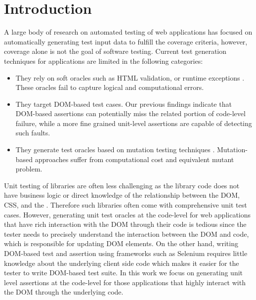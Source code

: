 \section{Introduction} \label{Sec:intro}
A large body of research on automated testing of \javascript web applications has focused on automatically generating test input data to fulfill the coverage criteria, however, coverage alone is not the goal of software testing.
Current test generation techniques for \javascript applications are limited in the following categories:
\begin{itemize}
\item They rely on soft oracles such as HTML validation, or runtime exceptions \cite{artzi:icse11}. These oracles fail to capture logical and computational errors. 
\item They target DOM-based test cases. Our previous findings\cite{mirshokraie:icst15} indicate that DOM-based assertions can potentially miss the related portion of
code-level failure, while a more fine grained unit-level assertions are capable of detecting such faults.
\item They generate test oracles based on mutation testing techniques \cite{mirshokraie:icst15, fraser:tse12}. Mutation-based approaches suffer from computational cost and equivalent mutant problem.
\end{itemize}
Unit testing of \javascript libraries are often less challenging as the \javascript library code does not have business logic or direct knowledge of the relationship between the DOM, CSS, and the \javascript. Therefore such libraries often come with comprehensive unit test cases. However, generating 
unit test oracles at the \javascript code-level for web applications that have rich interaction with the DOM through their \javascript code is tedious since the tester needs to precisely understand the interaction between the DOM and \javascript code, which is responsible for updating DOM elements. On the other hand,
writing DOM-based test and assertion using frameworks such as Selenium
requires little knowledge about the underlying client side code which makes it easier for the tester to write DOM-based test suite.
In this work we focus on generating unit level assertions at the \javascript code-level for those applications that highly interact with the DOM through the underlying \javascript code.  






